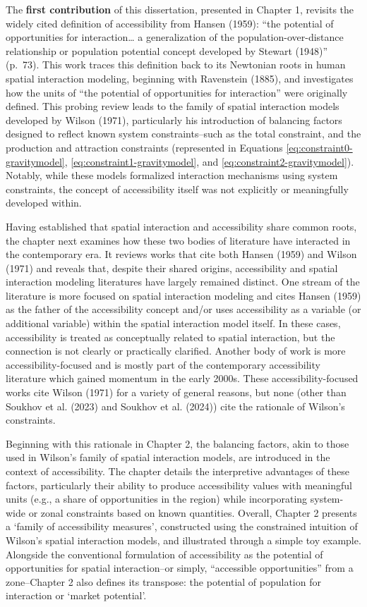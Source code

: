\documentclass[
11pt, %
oneside, %
english, %
singlespacing, %
]{macthesis} %
\begin{document}
The \textbf{first contribution} of this dissertation, presented in Chapter 1, revisits the widely cited definition of accessibility from Hansen (1959): ``the potential of opportunities for interaction\ldots{} a generalization of the population-over-distance relationship or population potential concept developed by Stewart (1948)'' (p.~73). This work traces this definition back to its Newtonian roots in human spatial interaction modeling, beginning with Ravenstein (1885), and investigates how the units of ``the potential of opportunities for interaction'' were originally defined. This probing review leads to the family of spatial interaction models developed by Wilson (1971), particularly his introduction of balancing factors designed to reflect known system constraints--such as the total constraint, and the production and attraction constraints (represented in Equations \ref{eq:constraint0-gravitymodel}, \ref{eq:constraint1-gravitymodel}, and \ref{eq:constraint2-gravitymodel}). Notably, while these models formalized interaction mechanisms using system constraints, the concept of accessibility itself was not explicitly or meaningfully developed within.

Having established that spatial interaction and accessibility share common roots, the chapter next examines how these two bodies of literature have interacted in the contemporary era. It reviews works that cite both Hansen (1959) and Wilson (1971) and reveals that, despite their shared origins, accessibility and spatial interaction modeling literatures have largely remained distinct. One stream of the literature is more focused on spatial interaction modeling and cites Hansen (1959) as the father of the accessibility concept and/or uses accessibility as a variable (or additional variable) within the spatial interaction model itself. In these cases, accessibility is treated as conceptually related to spatial interaction, but the connection is not clearly or practically clarified. Another body of work is more accessibility-focused and is mostly part of the contemporary accessibility literature which gained momentum in the early 2000s. These accessibility-focused works cite Wilson (1971) for a variety of general reasons, but none (other than Soukhov et al. (2023) and Soukhov et al. (2024)) cite the rationale of Wilson's constraints.

Beginning with this rationale in Chapter 2, the balancing factors, akin to those used in Wilson's family of spatial interaction models, are introduced in the context of accessibility. The chapter details the interpretive advantages of these factors, particularly their ability to produce accessibility values with meaningful units (e.g., a share of opportunities in the region) while incorporating system-wide or zonal constraints based on known quantities. Overall, Chapter 2 presents a `family of accessibility measures', constructed using the constrained intuition of Wilson's spatial interaction models, and illustrated through a simple toy example. Alongside the conventional formulation of accessibility as the potential of opportunities for spatial interaction--or simply, ``accessible opportunities'' from a zone--Chapter 2 also defines its transpose: the potential of population for interaction or `market potential'.
\end{document}
